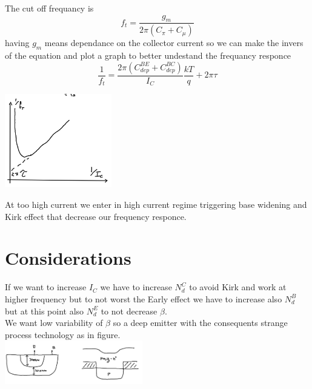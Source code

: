 The cut off frequancy is
\begin{equation}
f_t=\frac{g_m}{2\pi(C_\pi+C_\mu)}
\end{equation}
having $g_m$ means dependance on the collector current so we can make the invers of the equation and plot a graph to better undestand the frequancy responce
\begin{equation}
\frac{1}{f_t}=\frac{2\pi(C_{dep}^{BE}+C_{dep}^{BC})}{I_C}\frac{kT}{q}+2\pi\tau
\end{equation}

\centering
\includegraphics[width=0.35\textwidth]{bjt14.png}\\
\raggedright

At too high current we enter in high current regime triggering base widening and Kirk effect that decrease our frequency responce.\\



\section{Considerations}

If we want to increase $I_C$ we have to increase $N_d^C$ to avoid Kirk and work at higher frequency but to not worst the Early effect we have to increase also $N_d^B$ but at this point also $N_d^E$ to not decrease $\beta$.\\
\vspace{5mm}
We want low variability of $\beta$ so a deep emitter with the consequents strange process technology as in figure.\\

\centering
\includegraphics[width=0.45\textwidth]{bjtfinal.png}\\
\raggedright

